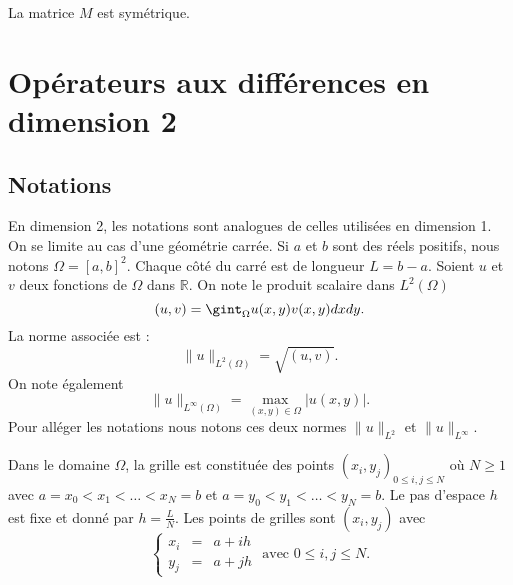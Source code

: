 La matrice $M$ est symétrique.




































\section{Opérateurs aux différences en dimension 2}


\subsection{Notations}
\label{sec:notation_2D}

En dimension 2, les notations sont analogues de celles utilisées en dimension 1. On se limite au cas d'une géométrie carrée. Si $a$ et $b$ sont des réels positifs, nous notons $\Omega = [a,b]^2$. Chaque côté du carré est de longueur $L=b-a$. 
Soient $u$ et $v$ deux fonctions de $\Omega$ dans $\mathbb{R}$. On note le produit scalaire dans $L^2 ( \Omega )$
\begin{equation}
(u,v) = \gint_{\Omega} u(x,y) v(x,y) dx dy.
\end{equation}
La norme associée est :
\begin{equation}
\| u \|_{L^2(\Omega)} = \sqrt{(u,v)}. 
\end{equation}
On note également
\begin{equation}
\| u \|_{L^{\infty} ( \Omega )} = \max_{(x,y) \in \Omega} |u(x,y)|.
\end{equation}
Pour alléger les notations nous notons ces deux normes $\| u \|_{L^2}$ et $\| u \|_{L^{\infty}}$.

Dans le domaine $\Omega$, la grille est constituée des points $(x_i,y_j)_{0 \leq i,j \leq N}$ où $N \geq 1$ avec $a = x_0 < x_1 < \ldots < x_N = b$ et $a = y_0 < y_1 < \ldots < y_N = b$. Le pas d'espace $h$ est fixe et donné par $h = \frac{L}{N}$. Les points de grilles sont $(x_i, y_j)$ avec 
\begin{equation}
\left\lbrace\begin{array}{rcl}
x_i & = & a + i h \\
y_j & = & a + j h 
\end{array}\right. \text{ avec } 0 \leq i,j \leq N.
\end{equation}

